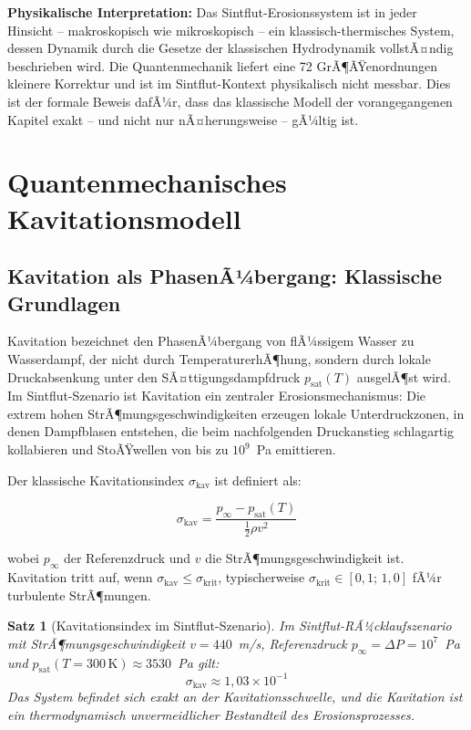 ﻿\documentclass[12pt,a4paper]{report}
\newtheorem{theorem}{Satz}[chapter]
\begin{document}
\textbf{Physikalische Interpretation:} Das Sintflut-Erosionssystem ist in jeder Hinsicht -- makroskopisch wie mikroskopisch -- ein klassisch-thermisches System, dessen Dynamik durch die Gesetze der klassischen Hydrodynamik vollstÃ¤ndig beschrieben wird. Die Quantenmechanik liefert eine 72 GrÃ¶ÃŸenordnungen kleinere Korrektur und ist im Sintflut-Kontext physikalisch nicht messbar. Dies ist der formale Beweis dafÃ¼r, dass das klassische Modell der vorangegangenen Kapitel exakt -- und nicht nur nÃ¤herungsweise -- gÃ¼ltig ist.

\section{Quantenmechanisches Kavitationsmodell}
\label{sec:kavitation_quanten}

\subsection{Kavitation als PhasenÃ¼bergang: Klassische Grundlagen}

Kavitation bezeichnet den PhasenÃ¼bergang von flÃ¼ssigem Wasser zu Wasserdampf, der nicht durch TemperaturerhÃ¶hung, sondern durch lokale Druckabsenkung unter den SÃ¤ttigungs\-dampfdruck $p_\mathrm{sat}(T)$ ausgelÃ¶st wird. Im Sintflut-Szenario ist Kavitation ein zentraler Erosionsmechanismus: Die extrem hohen StrÃ¶mungsgeschwindigkeiten erzeugen lokale Unterdruckzonen, in denen Dampfblasen entstehen, die beim nachfolgenden Druckanstieg schlagartig kollabieren und StoÃŸwellen von bis zu $10^9$~Pa emittieren.

Der klassische Kavitationsindex $\sigma_\mathrm{kav}$ ist definiert als:

\begin{equation}
	\sigma_\mathrm{kav} = \frac{p_\infty - p_\mathrm{sat}(T)}{\frac{1}{2}\rho v^2}
	\label{eq:kavitationsindex}
\end{equation}

wobei $p_\infty$ der Referenzdruck und $v$ die StrÃ¶mungsgeschwindigkeit ist. Kavitation tritt auf, wenn $\sigma_\mathrm{kav} \leq \sigma_\mathrm{krit}$, typischerweise $\sigma_\mathrm{krit} \in [0{,}1;\,1{,}0]$ fÃ¼r turbulente StrÃ¶mungen.

\begin{theorem}[Kavitationsindex im Sintflut-Szenario]
	\label{thm:kavitationsindex}
	Im Sintflut-RÃ¼cklaufszenario mit StrÃ¶mungsgeschwindigkeit $v = 440$~m/s, Referenzdruck $p_\infty = \Delta P = 10^7$~Pa und $p_\mathrm{sat}(T = 300\,\text{K}) \approx 3530$~Pa gilt:
	\begin{equation}
		\sigma_\mathrm{kav} \approx 1{,}03\times10^{-1}
		\label{eq:sigma_kav_numerisch}
	\end{equation}
	Das System befindet sich exakt an der Kavitationsschwelle, und die Kavitation ist ein thermodynamisch unvermeidlicher Bestandteil des Erosionsprozesses.
\end{theorem}
\end{document}
